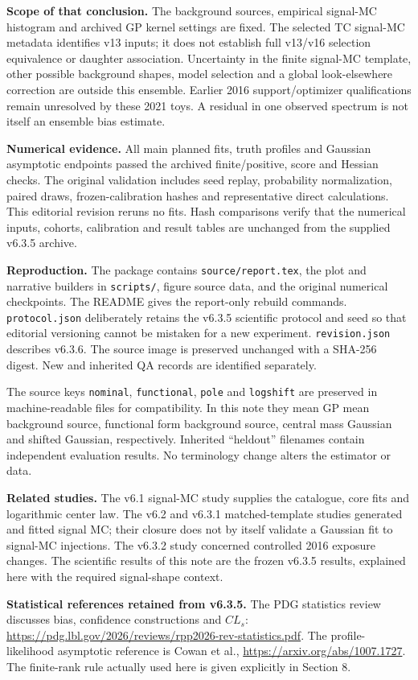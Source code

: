 \documentclass[11pt]{article}
\begin{document}
\textbf{Scope of that conclusion.} The background sources, empirical signal-MC histogram and archived GP kernel settings are fixed. The selected TC signal-MC metadata identifies v13 inputs; it does not establish full v13/v16 selection equivalence or daughter association. Uncertainty in the finite signal-MC template, other possible background shapes, model selection and a global look-elsewhere correction are outside this ensemble. Earlier 2016 support/optimizer qualifications remain unresolved by these 2021 toys. A residual in one observed spectrum is not itself an ensemble bias estimate.

\textbf{Numerical evidence.} All main planned fits, truth profiles and Gaussian asymptotic endpoints passed the archived finite/positive, score and Hessian checks. The original validation includes seed replay, probability normalization, paired draws, frozen-calibration hashes and representative direct calculations. This editorial revision reruns no fits. Hash comparisons verify that the numerical inputs, cohorts, calibration and result tables are unchanged from the supplied v6.3.5 archive.

\textbf{Reproduction.} The package contains \texttt{source/report.tex}, the plot and narrative builders in \texttt{scripts/}, figure source data, and the original numerical checkpoints. The README gives the report-only rebuild commands. \texttt{protocol.json} deliberately retains the v6.3.5 scientific protocol and seed so that editorial versioning cannot be mistaken for a new experiment. \texttt{revision.json} describes v6.3.6. The source image is preserved unchanged with a SHA-256 digest. New and inherited QA records are identified separately.

The source keys \texttt{nominal}, \texttt{functional}, \texttt{pole} and \texttt{logshift} are preserved in machine-readable files for compatibility. In this note they mean GP mean background source, functional form background source, central mass Gaussian and shifted Gaussian, respectively. Inherited ``heldout'' filenames contain independent evaluation results. No terminology change alters the estimator or data.

\textbf{Related studies.} The v6.1 signal-MC study supplies the catalogue, core fits and logarithmic center law. The v6.2 and v6.3.1 matched-template studies generated and fitted signal MC; their closure does not by itself validate a Gaussian fit to signal-MC injections. The v6.3.2 study concerned controlled 2016 exposure changes. The scientific results of this note are the frozen v6.3.5 results, explained here with the required signal-shape context.

\textbf{Statistical references retained from v6.3.5.} The PDG statistics review discusses bias, confidence constructions and $CL_s$: \url{https://pdg.lbl.gov/2026/reviews/rpp2026-rev-statistics.pdf}. The profile-likelihood asymptotic reference is Cowan et al., \url{https://arxiv.org/abs/1007.1727}. The finite-rank rule actually used here is given explicitly in Section 8.
\end{document}
